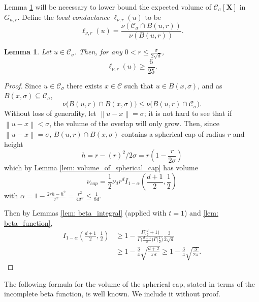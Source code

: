 \documentclass{article}
\newcommand{\norm}[1]{\left\lVert#1\right\rVert}
\newcommand{\1}{\mathbf{1}}
\newcommand{\Xbf}{\mathbf{X}}
\newcommand{\Cset}{\mathcal{C}}
\newcommand{\Csig}{\Cset_{\sigma}}
\theoremstyle{aldenthm}
\newtheorem{lemma}{Lemma}
\begin{document}
Lemma \ref{lem: local_conductance} will be necessary to lower bound the expected volume of $\Csig[\Xbf]$ in $G_{n,r}$. Define the \emph{local conductance} $\ell_{\nu,r}(u)$ to be
\begin{equation*}
\ell_{\nu,r}(u) = \frac{\nu\left(\Csig \cap B(u,r)\right)}{\nu\left(B(u,r)\right)}.
\end{equation*}
\begin{lemma}
	\label{lem: local_conductance}
	Let $u \in \Csig$. Then, for any $0 < r \leq \frac{\sigma}{2\sqrt{d}}$,
	\begin{equation*}
	\ell_{\nu,r}(u) \geq \frac{6}{25}. 
	\end{equation*}
\end{lemma}
\begin{proof}
	Since $u \in \Csig$ there exists $x \in \Cset$ such that $u \in B(x, \sigma)$, and as $B(x,\sigma) \subseteq \Csig$,
	\begin{equation*}
	\nu\bigl(B(u, r) \cap B(x, \sigma)\bigr) \leq \nu\bigl(B(u, r) \cap \Csig \bigr).
	\end{equation*}
	Without loss of generality, let $\norm{u - x} = \sigma$; it is not hard to see that if $\norm{u - x} < \sigma$, the volume of the overlap will only grow. Then, since $\norm{u  - x} = \sigma$, $B(u, r) \cap B(x, \sigma)$ contains a spherical cap of radius $r$ and height
	\begin{equation*}
	h = r - (r)^2/2\sigma = r \left( 1 - \frac{r}{2 \sigma} \right)
	\end{equation*}	
	which by Lemma \ref{lem: volume_of_spherical_cap} has volume
	\begin{equation*}
	\nu_{cap} = \frac{1}{2} \nu_d r^d I_{1 - \alpha}\left( \frac{d + 1}{2}  ,\frac{1}{2}\right)
	\end{equation*}
	with $\alpha = 1 - \frac{2rh - h^2}{r^2} = \frac{r^2}{4 \sigma^2} \leq \frac{1}{8d}$. 
	
	Then by Lemmas \ref{lem: beta_integral} (applied with $t = 1$) and \ref{lem: beta_function},
	\begin{align*}
	I_{1 - \alpha}\left( \frac{d + 1}{2}  ,\frac{1}{2}\right) & \geq 1 - \frac{\Gamma\bigl(\frac{d}{2}+ 1\bigr)}{\Gamma\bigl(\frac{d + 1}{2}\bigr) \Gamma\bigl(\frac{1}{2}\bigr)} \frac{3}{2\sqrt{d}} \\
	& \geq 1 - \frac{3}{4}\sqrt{\frac{d+2}{\pi d}} \geq 1 - \frac{3}{4}\sqrt{\frac{3}{2 \pi}}.
	\end{align*}
\end{proof}

The following formula for the volume of the spherical cap, stated in terms of the incomplete beta function, is well known. We include it without proof. 
\end{document}
